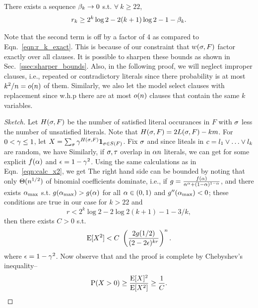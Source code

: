 \documentclass[letterpaper, 10pt, twocolumn, reqno]{amsart}
\begin{document}
\begin{theorem}
There exists a sequence $\beta_k \to 0$ s.t. $\forall\ k \geq 22$,
$$
r_k \geq 2^k \log 2 - 2(k+1) \log 2 - 1 - \beta_k.
$$
\label{thm:bound_weighted}
\end{theorem}
\begin{remark}
Note that the second term is off by a factor of 4 as compared to Eqn.~\eqref{eqn:r_k_exact}. This is because of our constraint that $w(\sigma,F)$ factor exactly over all clauses. It is possible to sharpen these bounds as shown in Sec.~\ref{ssec:sharper_bounds}. Also, in the following proof, we will neglect improper clauses, i.e., repeated or contradictory literals since there probability is at most $k^2/n = o(n)$ of them. Similarly, we also let the model select clauses with replacement since w.h.p there are at most $o(n)$ clauses that contain the same $k$ variables.
\end{remark}
%
\begin{proof}[Sketch] Let $H(\sigma,F)$ be the number of satisfied literal occurances in $F$ with $\sigma$ less the number of unsatisfied literals. Note that $H(\sigma,F) = 2L(\sigma,F) - k m$. For $0 < \gamma \leq 1$, let $X = \sum_\sigma \gamma^{H(\sigma,F)} {\bf 1}_{\sigma \in S(F)}$. Fix $\sigma$ and since liteals in $c = l_1 \vee \ldots \vee l_k$ are random, we have
Similarly, if $\sigma, \tau$ overlap in $\alpha n$ literals, we can get
for some explicit $f(\alpha)$ and $\epsilon = 1-\gamma^2$. Using the same calculations as in Eqn.~\eqref{eqn:calc_x2}, we get
The right hand side can be bounded by noting that only $\Theta(n^{1/2})$ of binomial coefficients dominate, i.e., if $g = \frac{f(\alpha)}{\alpha^\alpha + (1-\alpha)^{1-\alpha}}$,
and there exists $\alpha_{\max}$ s.t. $g(\alpha_{\max}) > g(\alpha)$ for all $\alpha \in (0,1)$ and $g''(\alpha_{\max}) < 0$; these conditions are true in our case for $k > 22$ and
$$
r < 2^k \log 2 -2 \log2(k+1) - 1 -3/k,
$$
then there exists $C > 0$ s.t.
$$
\textrm{E}[X^2] < C\ \left(\frac{2 g(1/2)}{(2-2\epsilon)^{kr}} \right)^n.
$$
where $\epsilon = 1-\gamma^2$. Now observe that
and the proof is complete by Chebyshev's inequality--
$$
\textrm{P}(X > 0) \geq \frac{\textrm{E}[X]^2}{\textrm{E}[X^2]} \geq \frac{1}{C}.
$$
\end{proof}
\end{document}
